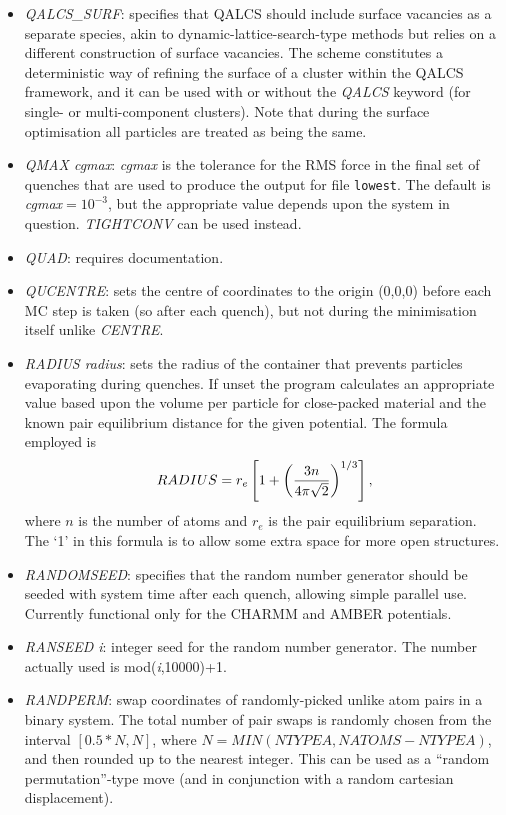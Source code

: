 \documentclass[12pt,a4paper,dvips]{article}
\begin{document}
\begin{itemize}
\item {\it QALCS\_SURF\/}: specifies that QALCS should include surface vacancies as a separate species, akin to dynamic-lattice-search-type methods but relies on a different construction of surface vacancies. The scheme constitutes a deterministic way of refining the surface of a cluster within the QALCS framework, and it can be used with or without the
{\it QALCS\/} keyword (for single- or multi-component clusters). Note that during the surface optimisation all particles are treated as being the same.

\item {\it QMAX cgmax\/}: {\it cgmax\/} is the tolerance for the 
RMS force in the final set of quenches that are used to produce
the output for file {\tt lowest}. The default is 
{\it cgmax\/}$=10^{-3}$, but the appropriate value depends upon the system in question.
{\it TIGHTCONV} can be used instead.

\item {\it QUAD\/}: requires documentation.

\item {\it QUCENTRE\/}: sets the centre of coordinates to the origin (0,0,0) before each MC step is taken (so after each quench), but not during the minimisation itself unlike {\it CENTRE}. 

\item {\it RADIUS radius\/}: sets the radius of the container that prevents particles
evaporating during quenches. If unset the program calculates an appropriate value
based upon the volume per particle for close-packed material and the known pair
equilibrium distance for the given potential. The formula employed is
$$  RADIUS=r_e\left[1 + \left(3 n \over 4\pi\sqrt{2}\right)^{1/3}\right], $$
where $n$ is the number of atoms and $r_e$ is the pair equilibrium
separation.\cite{kittel76} The `1' in this formula is to allow some extra space for
more open structures.

\item {\it RANDOMSEED\/}: specifies that the random number generator should be seeded with system time after each quench, allowing simple parallel use. Currently functional only for the CHARMM and AMBER potentials.

\item {\it RANSEED i\/}: integer seed for the random number generator. The number actually used is mod({\it i\/},10000)+1.

\item{\it RANDPERM}: swap coordinates of randomly-picked unlike atom pairs in a binary system. The total number of pair swaps is randomly chosen from the interval $[0.5*N, N]$, where $N = MIN(NTYPEA,NATOMS-NTYPEA)$, and then rounded up to the nearest integer. This can be used as a ``random permutation''-type move (and in conjunction with a random cartesian displacement).


\end{itemize}
\end{document}
